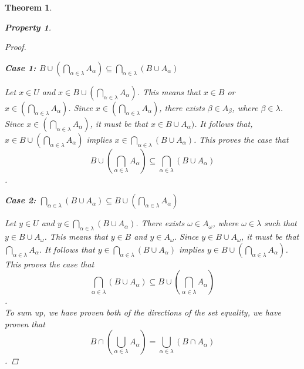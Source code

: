 \documentclass{book}
\newtheorem{theorem}{Theorem}[section]
\newtheorem{property}{Property}[theorem]
\theoremstyle{definition}
\theoremstyle{remark}
\begin{document}
\begin{theorem}
\begin{property}
\begin{proof}
            \begin{flushleft} \textbf{Case 1: $B \cup \left ( \bigcap_{\alpha \in \lambda}{A_{\alpha}} \right ) \subseteq \bigcap_{\alpha \in \lambda}{(B \cup A_{\alpha})}$} \end{flushleft}
                Let $x \in U$ and $x \in B \cup \left ( \bigcap_{\alpha \in \lambda}{A_{\alpha}} \right )$. This means that $x \in B$ or $x \in \left ( \bigcap_{\alpha \in \lambda}{A_{\alpha}} \right )$. Since $x \in \left ( \bigcap_{\alpha \in \lambda}{A_{\alpha}} \right )$, there exists $\beta \in A_{\beta}$, where $\beta \in \lambda$. Since $x \in \left ( \bigcap_{\alpha \in \lambda}{A_{\alpha}} \right )$, it must be that $x \in B \cup A_{\alpha})$. It follows that, $x \in B \cup \left ( \bigcap_{\alpha \in \lambda}{A_{\alpha}} \right )$ implies $x \in \bigcap_{\alpha \in \lambda}{(B \cup A_{\alpha})}$. This proves the case that $$B \cup \left ( \bigcap_{\alpha \in \lambda}{A_{\alpha}} \right ) \subseteq \bigcap_{\alpha \in \lambda}{(B \cup A_{\alpha})}$$. \\
                
            \begin{flushleft} \textbf{Case 2: $\bigcap_{\alpha \in \lambda}{(B \cup A_{\alpha})} \subseteq B \cup \left ( \bigcap_{\alpha \in \lambda}{A_{\alpha}} \right )$} \end{flushleft} 
                Let $y \in U$ and $y \in \bigcap_{\alpha \in \lambda}{(B \cup A_{\alpha})}$. There exists $\omega \in A_{\omega}$, where $\omega \in \lambda$ such that $y \in B \cup A_{\omega}$. This means that $y \in B$ and $y \in A_{\omega}$. Since $y \in B \cup A_{\omega}$, it must be that $\bigcap_{\alpha \in \lambda}{A_{\alpha}}$. It follows that $y \in \bigcap_{\alpha \in \lambda}{(B \cup A_{\alpha})}$ implies $y \in B \cup \left ( \bigcap_{\alpha \in \lambda}{A_{\alpha}} \right )$. This proves the case that $$\bigcap_{\alpha \in \lambda}{(B \cup A_{\alpha})} \subseteq B \cup \left ( \bigcap_{\alpha \in \lambda}{A_{\alpha}} \right )$$. \\
                
            To sum up, we have proven both of the directions of the set equality, we have proven that $$B \cap \left ( \bigcup_{\alpha \in \lambda}{A_{\alpha}} \right ) = \bigcup_{\alpha \in \lambda}{(B \cap A_{\alpha})}$$. 
        \end{proof}
    \end{property}

\end{theorem}
\end{document}
